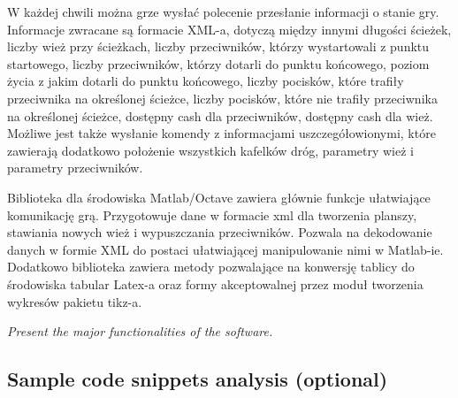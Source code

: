 W każdej chwili można grze wysłać polecenie przesłanie informacji o stanie gry.  Informacje zwracane są formacie XML-a, dotyczą między innymi długości ścieżek, liczby wież przy ścieżkach, liczby przeciwników, którzy wystartowali z punktu startowego, liczby przeciwników, którzy dotarli do punktu końcowego, poziom życia z jakim dotarli do punktu końcowego, liczby pocisków, które trafiły przeciwnika na określonej ścieżce, liczby pocisków, które nie trafiły przeciwnika na określonej ścieżce, dostępny cash dla przeciwników, dostępny cash dla wież. Możliwe jest także wysłanie komendy z informacjami uszczegółowionymi, które zawierają dodatkowo położenie wszystkich kafelków dróg, parametry wież i parametry przeciwników.
 
 Biblioteka dla środowiska Matlab/Octave zawiera głównie funkcje ułatwiające komunikację grą. Przygotowuje dane w formacie xml dla tworzenia planszy, stawiania nowych wież i wypuszczania przeciwników. Pozwala na dekodowanie danych w formie XML do postaci ułatwiającej manipulowanie nimi w Matlab-ie. Dodatkowo biblioteka zawiera metody pozwalające na konwersję tablicy do środowiska tabular Latex-a oraz formy akceptowalnej przez moduł tworzenia wykresów pakietu tikz-a.   
 
\textit{  Present the major functionalities of the software.}

 \subsection{Sample code snippets analysis (optional)}
